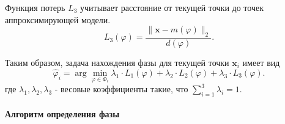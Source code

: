 \documentclass[12pt, twoside]{article}
\theoremstyle{definition}
\begin{document}
    
Функция потерь $L_3$ учитывает расстояние от текущей точки до точек аппроксимирующей модели.
\begin{equation}           
    L_3(\varphi) = \frac{\|\mathbf{x} - m(\varphi)\|_2}{d(\varphi)}.
\label{eq:L3} 
\end{equation}


Таким образом, задача нахождения фазы для текущей точки $\mathbf{x}_i$ имеет вид
\begin{equation} 
\widehat{\varphi}_i = \arg\min_{\varphi \in \Phi_i} \lambda_1\cdot L_1(\varphi) + \lambda_2 \cdot L_2(\varphi) + \lambda_3 \cdot L_3(\varphi).
\label{eq:argminL} 
\end{equation}
где $\lambda_1, \lambda_2, \lambda_3$ - весовые коэффициенты такие, что $\sum_{i=1}^{3} \lambda_i = 1$.

\paragraph{Алгоритм определения фазы} \label{paragraph:4.4}
\end{document}
